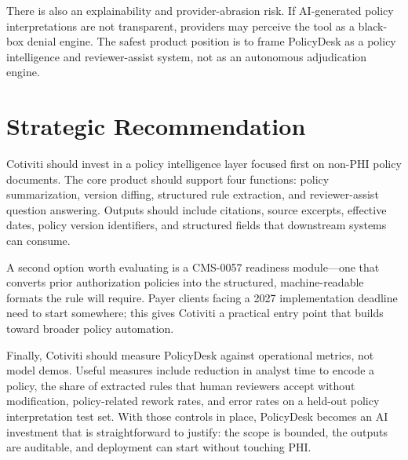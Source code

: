 \documentclass[11pt]{article}
\begin{document}
There is also an explainability and provider-abrasion risk. If AI-generated policy interpretations are not transparent, providers may perceive the tool as a black-box denial engine. The safest product position is to frame PolicyDesk as a policy intelligence and reviewer-assist system, not as an autonomous adjudication engine.

\section*{Strategic Recommendation}
Cotiviti should invest in a policy intelligence layer focused first on non-PHI policy documents. The core product should support four functions: policy summarization, version diffing, structured rule extraction, and reviewer-assist question answering. Outputs should include citations, source excerpts, effective dates, policy version identifiers, and structured fields that downstream systems can consume.

A second option worth evaluating is a CMS-0057 readiness module---one that converts prior authorization policies into the structured, machine-readable formats the rule will require. Payer clients facing a 2027 implementation deadline need to start somewhere; this gives Cotiviti a practical entry point that builds toward broader policy automation.

Finally, Cotiviti should measure PolicyDesk against operational metrics, not model demos. Useful measures include reduction in analyst time to encode a policy, the share of extracted rules that human reviewers accept without modification, policy-related rework rates, and error rates on a held-out policy interpretation test set. With those controls in place, PolicyDesk becomes an AI investment that is straightforward to justify: the scope is bounded, the outputs are auditable, and deployment can start without touching PHI.

\newpage
\end{document}
